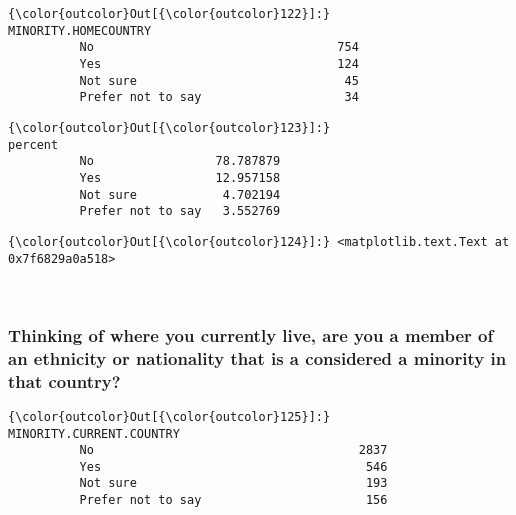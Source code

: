 \documentclass[11pt]{article}
\begin{document}
            \begin{Verbatim}[commandchars=\\\{\}]
{\color{outcolor}Out[{\color{outcolor}122}]:}                    MINORITY.HOMECOUNTRY
          No                                  754
          Yes                                 124
          Not sure                             45
          Prefer not to say                    34
\end{Verbatim}
        

            \begin{Verbatim}[commandchars=\\\{\}]
{\color{outcolor}Out[{\color{outcolor}123}]:}                      percent
          No                 78.787879
          Yes                12.957158
          Not sure            4.702194
          Prefer not to say   3.552769
\end{Verbatim}
        

            \begin{Verbatim}[commandchars=\\\{\}]
{\color{outcolor}Out[{\color{outcolor}124}]:} <matplotlib.text.Text at 0x7f6829a0a518>
\end{Verbatim}
        
    \begin{center}
    \end{center}
    { \hspace*{\fill} \\}
    

    \subsubsection{Thinking of where you currently live, are you a member of
an ethnicity or nationality that is a considered a minority in that
country?}\label{thinking-of-where-you-currently-live-are-you-a-member-of-an-ethnicity-or-nationality-that-is-a-considered-a-minority-in-that-country}


            \begin{Verbatim}[commandchars=\\\{\}]
{\color{outcolor}Out[{\color{outcolor}125}]:}                    MINORITY.CURRENT.COUNTRY
          No                                     2837
          Yes                                     546
          Not sure                                193
          Prefer not to say                       156
\end{Verbatim}
        
\end{document}
